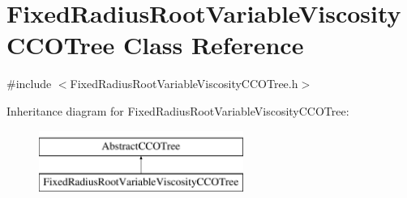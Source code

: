 \hypertarget{class_fixed_radius_root_variable_viscosity_c_c_o_tree}{}\section{Fixed\+Radius\+Root\+Variable\+Viscosity\+C\+C\+O\+Tree Class Reference}
\label{class_fixed_radius_root_variable_viscosity_c_c_o_tree}


{\ttfamily \#include $<$Fixed\+Radius\+Root\+Variable\+Viscosity\+C\+C\+O\+Tree.\+h$>$}

Inheritance diagram for Fixed\+Radius\+Root\+Variable\+Viscosity\+C\+C\+O\+Tree\+:\begin{figure}[H]
\begin{center}
\leavevmode
\includegraphics[height=2.000000cm]{d3/dca/class_fixed_radius_root_variable_viscosity_c_c_o_tree}
\end{center}
\end{figure}
